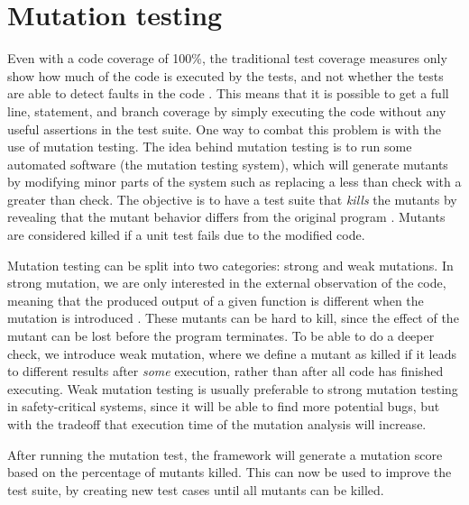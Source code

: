 \section{Mutation testing}
Even with a code coverage of 100\%, the traditional test coverage measures only show how much of the code is executed by the tests, and not whether the tests are able to detect faults in the code \cite{pitest}.
This means that it is possible to get a full line, statement, and branch coverage by simply executing the code without any useful assertions in the test suite.
One way to combat this problem is with the use of mutation testing.
The idea behind mutation testing is to run some automated software (the mutation testing system), which will generate mutants by modifying minor parts of the system such as replacing a less than check with a greater than check.
The objective is to have a test suite that \textit{kills} the mutants by revealing that the mutant behavior differs from the original program \cite{mutationtesting}.
Mutants are considered killed if a unit test fails due to the modified code.

Mutation testing can be split into two categories: strong and weak mutations.
In strong mutation, we are only interested in the external observation of the code, meaning that the produced output of a given function is different when the mutation is introduced \cite{mutationtesting}.
These mutants can be hard to kill, since the effect of the mutant can be lost before the program terminates.
To be able to do a deeper check, we introduce weak mutation, where we define a mutant as killed if it leads to different results after \textit{some} execution, rather than after all code has finished executing.
Weak mutation testing is usually preferable to strong mutation testing in safety-critical systems, since it will be able to find more potential bugs, but with the tradeoff that execution time of the mutation analysis will increase.

After running the mutation test, the framework will generate a mutation score based on the percentage of mutants killed.
This can now be used to improve the test suite, by creating new test cases until all mutants can be killed.

